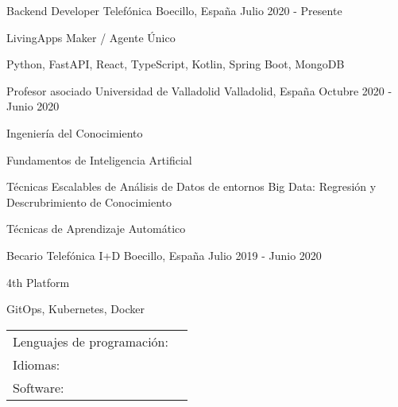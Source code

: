 \documentclass[]{awesome-cv}
\begin{document}
\vspace{-2mm}
\begin{cventries}
	\cventry
	{Backend Developer}
	{Telefónica}
	{Boecillo, España}
	{Julio 2020 - Presente}
	{\begin{cvitems}
		\item {LivingApps Maker / Agente Único}
		\item {Python, FastAPI, React, TypeScript, Kotlin, Spring Boot, MongoDB}
	\end{cvitems}}
	\cventry
	{Profesor asociado}
	{Universidad de Valladolid}
	{Valladolid, España}
	{Octubre 2020 - Junio 2020}
	{\begin{cvitems}
	    \item {Ingeniería del Conocimiento}
		\item {Fundamentos de Inteligencia Artificial}
		\item {Técnicas Escalables de Análisis de Datos de entornos Big Data: Regresión y Descrubrimiento de Conocimiento}
		\item {Técnicas de Aprendizaje Automático}
	\end{cvitems}}
	\cventry
	{Becario}
	{Telefónica I+D}
	{Boecillo, España}
	{Julio 2019 - Junio 2020}
	{\begin{cvitems}
		\item {4th Platform}
		\item {GitOps, Kubernetes, Docker}
	\end{cvitems}
	}
\end{cventries}
\begin{cventries}
	\cventry
	{}
	{\def\arraystretch{1.15}{\begin{tabular}{ l l }
		Lenguajes de programación:  & {\skill{ Rust, C, Python, Java, Kotlin, JavaScript, SQL, Prolog}} \\
		Idiomas:  & {\skill{ Español (nativo), Inglés ( FIRST B2)}} \\
		Software: & {\skill{Linux, Kubernetes, Docker, Azure, AWS, \LaTeX , PostgreSQL, Microsoft Office, Git}} \\
		\end{tabular}}}
	{}
	{}
	{}
\end{cventries}
\end{document}
